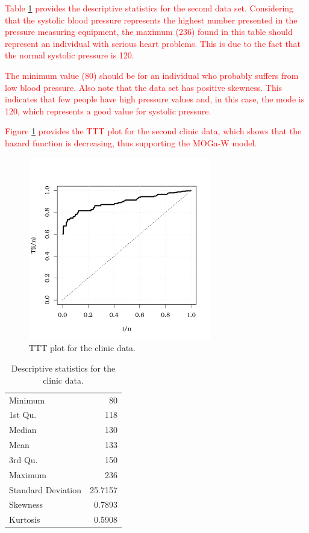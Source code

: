 \documentclass[twoside,leqno,11pt]{article}
\begin{document}
\textcolor{red}{Table \ref{tabds2} provides the descriptive statistics for the second data set. Consi\-dering that the systolic blood pressure represents the highest number presented in the pressure measuring equipment, the maximum (236) found in this 
table should represent an individual with serious heart problems. This is due to the fact that the normal systolic pressure is 120.} 
 
 \textcolor{red}{The minimum value (80) should be for 
 an individual who probably suffers from low blood pressure. Also note that the data set has positive skewness. This indicates that few people have high pressure values and, in this case, the mode is 120, which represents a good value for systolic pressure.}

 \textcolor{red}{Figure \ref{ttt2} provides the TTT plot 
 for the second clinic data, which shows that the hazard function is decreasing, thus supporting the MOGa-W model.}

\begin{figure}[H]
\begin{center}
\includegraphics[height=8cm, width=8cm]{TTT_app_2.pdf}
\caption{TTT plot for the clinic data.\label{ttt2}}
\end{center}
\end{figure}

\begin{table}[H] 
\center
\caption{Descriptive statistics for the clinic data.}
\label{tabds2}
\begin{tabular}{lr}
\hline\noalign{\smallskip}
   Minimum & 80\\
   1st Qu.& 118\\
   Median&  130\\
   Mean& 133 \\
   3rd  Qu.&  150 \\
   Maximum &  236\\
   Standard Deviation & 25.7157\\
   Skewness & 0.7893\\
   Kurtosis & 0.5908\\
\hline
\end{tabular}
\end{table}
\end{document}
